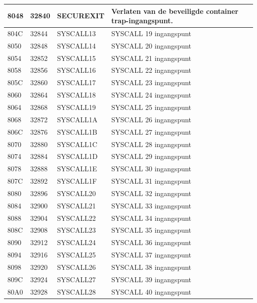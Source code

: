 \begin{longtable}{|L{1.2cm}|L{1.1cm}|C{2cm}|L{6cm}|}
\hline
\small  8048 & \small 32840 & SECUREXIT & Verlaten van de beveiligde container trap-ingangspunt. \\
\hline
\small  804C & \small 32844 & SYSCALL13 & SYSCALL 19 ingangspunt \\
\hline
\small  8050 & \small 32848 & SYSCALL14 & SYSCALL 20 ingangspunt \\
\hline
\small  8054 & \small 32852 & SYSCALL15 & SYSCALL 21 ingangspunt \\
\hline
\small  8058 & \small 32856 & SYSCALL16 & SYSCALL 22 ingangspunt \\
\hline
\small  805C & \small 32860 & SYSCALL17 & SYSCALL 23 ingangspunt \\
\hline
\small  8060 & \small 32864 & SYSCALL18 & SYSCALL 24 ingangspunt \\
\hline
\small  8064 & \small 32868 & SYSCALL19 & SYSCALL 25 ingangspunt \\
\hline
\small  8068 & \small 32872 & SYSCALL1A & SYSCALL 26 ingangspunt \\
\hline
\small  806C & \small 32876 & SYSCALL1B & SYSCALL 27 ingangspunt \\
\hline
\small  8070 & \small 32880 & SYSCALL1C & SYSCALL 28 ingangspunt \\
\hline
\small  8074 & \small 32884 & SYSCALL1D & SYSCALL 29 ingangspunt \\
\hline
\small  8078 & \small 32888 & SYSCALL1E & SYSCALL 30 ingangspunt \\
\hline
\small  807C & \small 32892 & SYSCALL1F & SYSCALL 31 ingangspunt \\
\hline
\small  8080 & \small 32896 & SYSCALL20 & SYSCALL 32 ingangspunt \\
\hline
\small  8084 & \small 32900 & SYSCALL21 & SYSCALL 33 ingangspunt \\
\hline
\small  8088 & \small 32904 & SYSCALL22 & SYSCALL 34 ingangspunt \\
\hline
\small  808C & \small 32908 & SYSCALL23 & SYSCALL 35 ingangspunt \\
\hline
\small  8090 & \small 32912 & SYSCALL24 & SYSCALL 36 ingangspunt \\
\hline
\small  8094 & \small 32916 & SYSCALL25 & SYSCALL 37 ingangspunt \\
\hline
\small  8098 & \small 32920 & SYSCALL26 & SYSCALL 38 ingangspunt \\
\hline
\small  809C & \small 32924 & SYSCALL27 & SYSCALL 39 ingangspunt \\
\hline
\small  80A0 & \small 32928 & SYSCALL28 & SYSCALL 40 ingangspunt \\

\end{longtable}
